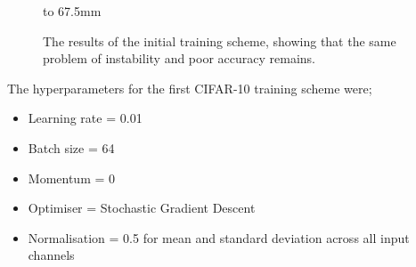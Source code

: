 \begin{figure}[p]
{    }
    \hspace{0mm}
    \hbox to 67.5mm{}%
    \caption[The results of the initial training scheme for CIFAR-10.]{The results of the initial training scheme, showing that the same problem of instability and poor accuracy remains.}
    \label{fig:cifar_training_scheme_1}
\end{figure}


The \gls{hyperparameter}s for the first CIFAR-10 training scheme were;

\begin{itemize}
    \item Learning rate = 0.01
    \item Batch size = 64
    \item Momentum = 0
    \item Optimiser = Stochastic Gradient Descent
    \item Normalisation = 0.5 for mean and standard deviation across all input channels
\end{itemize}